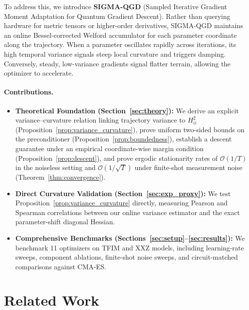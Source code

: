 \documentclass[11pt,a4paper]{article}
\begin{document}
To address this, we introduce \textbf{SIGMA-QGD} (Sampled Iterative Gradient Moment Adaptation for Quantum Gradient Descent). Rather than querying hardware for metric tensors or higher-order derivatives, SIGMA-QGD maintains an online Bessel-corrected Welford accumulator \cite{welford1962note} for each parameter coordinate along the trajectory. When a parameter oscillates rapidly across iterations, its high temporal variance signals steep local curvature and triggers damping. Conversely, steady, low-variance gradients signal flatter terrain, allowing the optimizer to accelerate.

\paragraph{Contributions.}
\begin{itemize}
    \item \textbf{Theoretical Foundation (Section~\ref{sec:theory}):} We derive an explicit variance--curvature relation linking trajectory variance to $H_{ii}^2$ (Proposition~\ref{prop:variance_curvature}), prove uniform two-sided bounds on the preconditioner (Proposition~\ref{prop:boundedness}), establish a descent guarantee under an empirical coordinate-wise margin condition (Proposition~\ref{prop:descent}), and prove ergodic stationarity rates of $\mathcal{O}(1/T)$ in the noiseless setting and $\mathcal{O}(1/\sqrt{T})$ under finite-shot measurement noise (Theorem~\ref{thm:convergence}).
    \item \textbf{Direct Curvature Validation (Section~\ref{sec:exp_proxy}):} We test Proposition~\ref{prop:variance_curvature} directly, measuring Pearson and Spearman correlations between our online variance estimator and the exact parameter-shift diagonal Hessian.
    \item \textbf{Comprehensive Benchmarks (Sections~\ref{sec:setup}--\ref{sec:results}):} We benchmark 11 optimizers on TFIM and XXZ models, including learning-rate sweeps, component ablations, finite-shot noise sweeps, and circuit-matched comparisons against CMA-ES.
\end{itemize}

\section{Related Work}
\label{sec:related}
\end{document}
